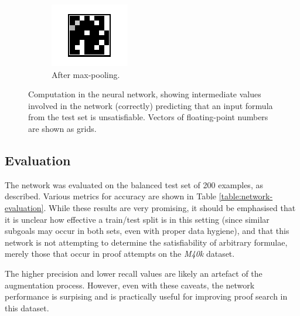 \documentclass[runningheads]{llncs}
\newcommand{\mizarlarge}{\textit{M40k}}
\begin{document}
\begin{figure}
	\begin{subfigure}{.3\textwidth}
		\centering
		\includegraphics[width=\linewidth]{fc0}
		\caption{After max-pooling.}
	\end{subfigure}
	\caption{Computation in the neural network, showing intermediate values involved in the network (correctly) predicting that an input formula from the test set is unsatisfiable. Vectors of floating-point numbers are shown as grids.}
	\label{figure:computation}
\end{figure}

\subsection{Evaluation}
The network was evaluated on the balanced test set of 200 examples, as described.
Various metrics for accuracy are shown in Table \ref{table:network-evaluation}.
While these results are very promising, it should be emphasised that it is unclear how effective a train/test split is in this setting (since similar subgoals may occur in both sets, even with proper data hygiene), and that this network is not attempting to determine the satisfiability of arbitrary formulae, merely those that occur in proof attempts on the \mizarlarge{} dataset.

The higher precision and lower recall values are likely an artefact of the augmentation process.
However, even with these caveats, the network performance is surpising and is practically useful for improving proof search in this dataset.
\end{document}
